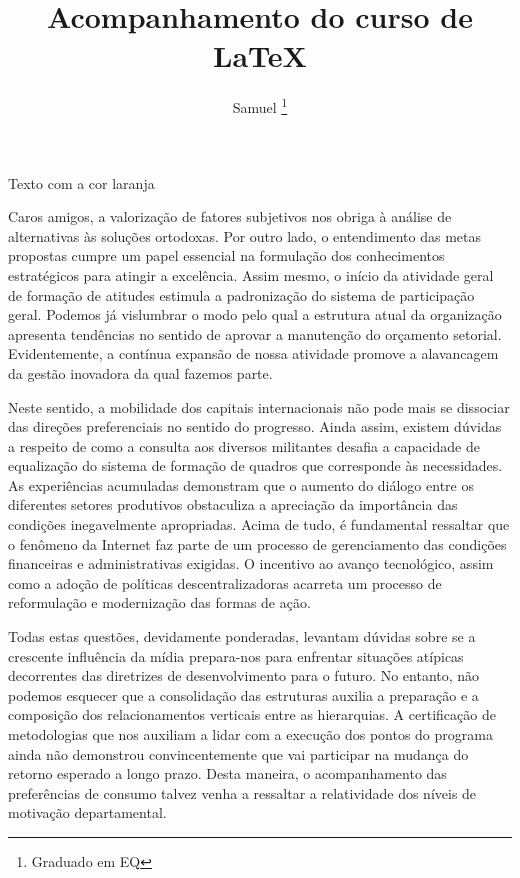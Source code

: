 \documentclass[12pt, a4paper]{article}
\title{Acompanhamento do curso de LaTeX}
\author{Samuel \footnote{Graduado em EQ}}
\begin{document}
	\maketitle%
	
	\textcolor{laranja}{Texto com a cor laranja}
	
	{\color{Violet}{Texto com cor Aqua}}
	
	
	
	\begin{flushleft}
		Caros amigos, a valorização de fatores subjetivos nos obriga à análise de alternativas às soluções ortodoxas. Por outro lado, o entendimento das metas propostas cumpre um papel essencial na formulação dos conhecimentos estratégicos para atingir a excelência. Assim mesmo, o início da atividade geral de formação de atitudes estimula a padronização do sistema de participação geral. Podemos já vislumbrar o modo pelo qual a estrutura atual da organização apresenta tendências no sentido de aprovar a manutenção do orçamento setorial. Evidentemente, a contínua expansão de nossa atividade promove a alavancagem da gestão inovadora da qual fazemos parte.
	\end{flushleft}
	
	\begin{center}
		Neste sentido, a mobilidade dos capitais internacionais não pode mais se dissociar das direções preferenciais no sentido do progresso. Ainda assim, existem dúvidas a respeito de como a consulta aos diversos militantes desafia a capacidade de equalização do sistema de formação de quadros que corresponde às necessidades. As experiências acumuladas demonstram que o aumento do diálogo entre os diferentes setores produtivos obstaculiza a apreciação da importância das condições inegavelmente apropriadas. Acima de tudo, é fundamental ressaltar que o fenômeno da Internet faz parte de um processo de gerenciamento das condições financeiras e administrativas exigidas. O incentivo ao avanço tecnológico, assim como a adoção de políticas descentralizadoras acarreta um processo de reformulação e modernização das formas de ação.
	\end{center}
	
	\begin{flushright}
		Todas estas questões, devidamente ponderadas, levantam dúvidas sobre se a crescente influência da mídia prepara-nos para enfrentar situações atípicas decorrentes das diretrizes de desenvolvimento para o futuro. No entanto, não podemos esquecer que a consolidação das estruturas auxilia a preparação e a composição dos relacionamentos verticais entre as hierarquias. A certificação de metodologias que nos auxiliam a lidar com a execução dos pontos do programa ainda não demonstrou convincentemente que vai participar na mudança do retorno esperado a longo prazo. Desta maneira, o acompanhamento das preferências de consumo talvez venha a ressaltar a relatividade dos níveis de motivação departamental.
	\end{flushright}
	
\end{document}

